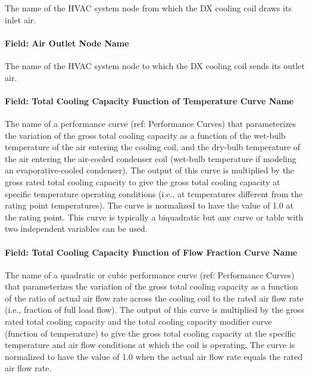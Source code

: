 The name of the HVAC system node from which the DX cooling coil draws its inlet air.

\paragraph{Field: Air Outlet Node Name}\label{field-air-outlet-node-name-9-000}

The name of the HVAC system node to which the DX cooling coil sends its outlet air.

\paragraph{Field: Total Cooling Capacity Function of Temperature Curve Name}\label{field-total-cooling-capacity-function-of-temperature-curve-name}

The name of a performance curve (ref: Performance Curves) that parameterizes the variation of the gross total cooling capacity as a function of the wet-bulb temperature of the air entering the cooling coil, and the dry-bulb temperature of the air entering the air-cooled condenser coil (wet-bulb temperature if modeling an evaporative-cooled condenser). The output of this curve is multiplied by the gross rated total cooling capacity to give the gross total cooling capacity at specific temperature operating conditions (i.e., at temperatures different from the rating point temperatures). The curve is normalized to have the value of 1.0 at the rating point. This curve is typically a biquadratic but any curve or table with two independent variables can be used.

\paragraph{Field: Total Cooling Capacity Function of Flow Fraction Curve Name}\label{field-total-cooling-capacity-function-of-flow-fraction-curve-name}

The name of a quadratic or cubic performance curve (ref: Performance Curves) that parameterizes the variation of the gross total cooling capacity as a function of the ratio of actual air flow rate across the cooling coil to the rated air flow rate (i.e., fraction of full load flow). The output of this curve is multiplied by the gross rated total cooling capacity and the total cooling capacity modifier curve (function of temperature) to give the gross total cooling capacity at the specific temperature and air flow conditions at which the coil is operating. The curve is normalized to have the value of 1.0 when the actual air flow rate equals the rated air flow rate.

